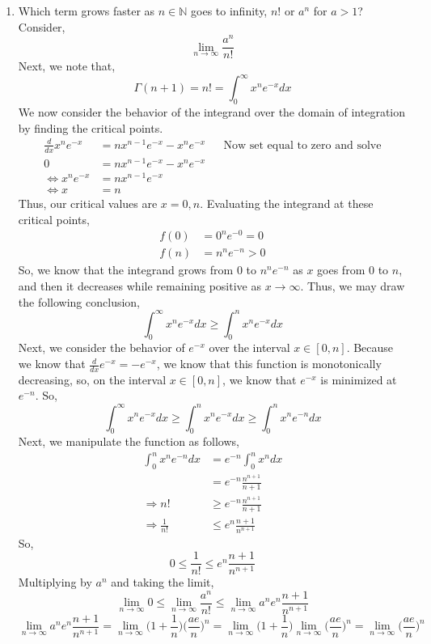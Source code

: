 \documentclass[letterpaper,10pt]{article}
\newcommand{\N}{\mathbb{N}}
\begin{document}
\begin{enumerate}
\item Which term grows faster as $n\in \N$ goes to infinity, $n!$ or $a^n$ for $a>1$?\\
Consider,
\[\lim_{n\to\infty}\frac{a^n}{n!}\]
Next, we note that,
\[\Gamma(n+1)=n!=\int_0^{\infty}x^ne^{-x}dx\]
We now consider the behavior of the integrand over the domain of integration by finding the critical points.
\begin{align*}
\frac{d}{dx}x^ne^{-x} &= nx^{n-1}e^{-x}-x^ne^{-x} &&\text{Now set equal to zero and solve}\\
0 &= nx^{n-1}e^{-x}-x^ne^{-x}\\
\Leftrightarrow x^ne^{-x} &= nx^{n-1}e^{-x} \\
\Leftrightarrow x &= n
\end{align*}
Thus, our critical values are $x=0,n$. Evaluating the integrand at these critical points,
\begin{align*}
f(0) &= 0^ne^{-0}=0\\
f(n) &= n^ne^{-n}>0
\end{align*}
So, we know that the integrand grows from $0$ to $n^ne^{-n}$ as $x$ goes from $0$ to $n$, and then it decreases while remaining positive as $x\to \infty$. Thus, we may draw the following conclusion,
\[\int_0^{\infty}x^ne^{-x}dx\geq \int_0^{n}x^ne^{-x}dx\]
Next, we consider the behavior of $e^{-x}$ over the interval $x\in[0,n]$. Because we know that $\frac{d}{dx}e^{-x}=-e^{-x}$, we know that this function is monotonically decreasing, so, on the interval $x\in[0,n]$, we know that $e^{-x}$ is minimized at $e^{-n}$. So,
\[\int_0^{\infty}x^ne^{-x}dx\geq \int_0^{n}x^ne^{-x}dx\geq \int_0^{n}x^ne^{-n}dx\]
Next, we manipulate the function as follows,
\begin{align*}
\int_0^{n}x^ne^{-n}dx &= e^{-n}\int_0^{n}x^ndx\\
&= e^{-n} \frac{n^{n+1}}{n+1}\\
\Rightarrow n! &\geq e^{-n} \frac{n^{n+1}}{n+1}\\
\Rightarrow \frac{1}{n!} &\leq e^n\frac{n+1}{n^{n+1}}
\end{align*}
So,
\[0\leq \frac{1}{n!} \leq e^n\frac{n+1}{n^{n+1}}\]
Multiplying by $a^n$ and taking the limit,
\[\lim_{n\to \infty} 0 \leq \lim_{n\to \infty} \frac{a^n}{n!} \leq \lim_{n\to \infty} a^ne^n\frac{n+1}{n^{n+1}}\]
\[\lim_{n\to \infty} a^ne^n\frac{n+1}{n^{n+1}}= \lim_{n\to \infty} \bigg(1+\frac{1}{n}\bigg)\bigg(\frac{ae}{n}\bigg)^n=\lim_{n\to \infty} \bigg(1+\frac{1}{n}\bigg) \lim_{n\to \infty} \bigg(\frac{ae}{n}\bigg)^n=\lim_{n\to \infty} \bigg(\frac{ae}{n}\bigg)^n\]

\end{enumerate}
\end{document}
